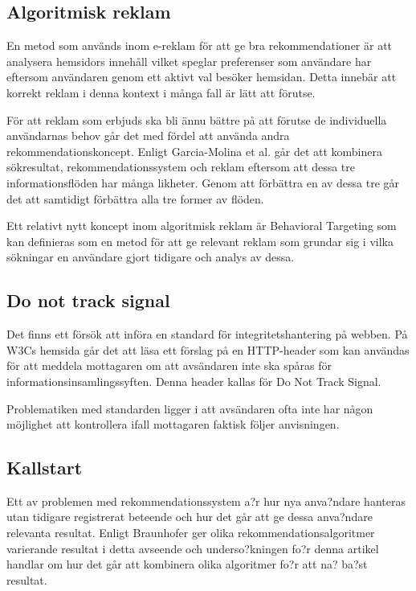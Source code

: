 \documentclass[a4paper,11pt]{article}
\begin{document}
{\subsection{Algoritmisk reklam}
En metod som används inom e-reklam för att ge bra rekommendationer är att analysera hemsidors innehåll \cite{Kushal} vilket speglar preferenser som användare har eftersom användaren genom ett aktivt val besöker hemsidan. Detta innebär att korrekt reklam i denna kontext i många fall är lätt att förutse. 

För att reklam som erbjuds ska bli ännu bättre på att förutse de individuella användarnas behov går det med fördel att använda andra rekommendationskoncept. Enligt Garcia-Molina et al. \cite{Garcia} går det att kombinera sökresultat, rekommendationssystem och reklam eftersom att dessa tre informationsflöden har många likheter. Genom att förbättra en av dessa tre går det att samtidigt förbättra alla tre former av flöden.

Ett relativt nytt koncept inom algoritmisk reklam är Behavioral Targeting \cite{Yan} som kan definieras som en metod för att ge relevant reklam som grundar sig i vilka sökningar en användare gjort tidigare och analys av dessa. 

\subsection{Do not track signal}
Det finns ett försök att införa en standard för integritetshantering på webben. På W3Cs hemsida \cite{Doty} går det att läsa ett förslag på en HTTP-header som kan användas för att meddela mottagaren om att avsändaren inte ska spåras för informationsinsamlingssyften. Denna header kallas för Do Not Track Signal. 

Problematiken med standarden ligger i att avsändaren ofta inte har någon möjlighet att kontrollera ifall mottagaren faktisk följer anvisningen. 

\subsection{Kallstart}
Ett av problemen med rekommendationssystem a?r hur nya anva?ndare hanteras utan tidigare registrerat beteende och hur det går att ge dessa anva?ndare relevanta resultat. Enligt Braunhofer \cite{Braunhofer} ger olika rekommendationsalgoritmer varierande resultat i detta avseende och underso?kningen fo?r denna artikel handlar om hur det går att kombinera olika algoritmer fo?r att na? ba?st resultat.


}
\end{document}
